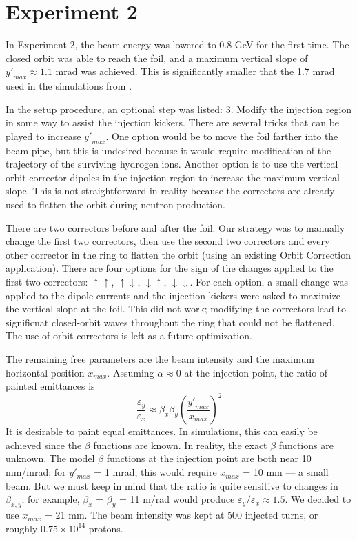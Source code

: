 \section{Experiment 2}

In Experiment 2, the beam energy was lowered to 0.8 GeV for the first time. The closed orbit was able to reach the foil, and a maximum vertical slope of ${y'}_{max} \approx 1.1$ mrad was achieved. This is significantly smaller that the 1.7 mrad used in the simulations from \cite{Holmes2018}. 

In the setup procedure, an optional step was listed: 3. Modify the injection region in some way to assist the injection kickers. There are several tricks that can be played to increase ${y'}_{max}$. One option would be to move the foil farther into the beam pipe, but this is undesired because it would require modification of the trajectory of the surviving hydrogen ions. Another option is to use the vertical orbit corrector dipoles in the injection region to increase the maximum vertical slope. This is not straightforward in reality because the correctors are already used to flatten the orbit during neutron production.

There are two correctors before and after the foil. Our strategy was to manually change the first two correctors, then use the second two correctors and every other corrector in the ring to flatten the orbit (using an existing Orbit Correction application). There are four options for the sign of the changes applied to the first two correctors: $\uparrow\uparrow$, $\uparrow\downarrow$, $\downarrow\uparrow$, $\downarrow\downarrow$. For each option, a small change was applied to the dipole currents and the injection kickers were asked to maximize the vertical slope at the foil. This did not work; modifying the correctors lead to significnat closed-orbit waves throughout the ring that could not be flattened. The use of orbit correctors is left as a future optimization. 

The remaining free parameters are the beam intensity and the maximum horizontal position $x_{max}$. Assuming $\alpha \approx 0$ at the injection point, the ratio of painted emittances is
%
\begin{equation}
    \frac{\varepsilon_y}{\varepsilon_x} \approx 
    \beta_x \beta_y \left(\frac{{y'}_{max}}{x_{max}}\right)^2 
\end{equation}
%
It is desirable to paint equal emittances. In simulations, this can easily be achieved since the $\beta$ functions are known. In reality, the exact $\beta$ functions are unknown. The model $\beta$ functions at the injection point are both near 10 mm/mrad; for $y'_{max}$ = 1 mrad, this would require $x_{max}$ = 10 mm — a small beam. But we must keep in mind that the ratio is quite sensitive to changes in $\beta_{x, y}$; for example, $\beta_x$ = $\beta_y$ = 11 m/rad would produce $\varepsilon_y / \varepsilon_x \approx 1.5$. We decided to use $x_{max}$ = 21 mm. The beam intensity was kept at 500 injected turns, or roughly $0.75 \times 10^{14}$ protons.

